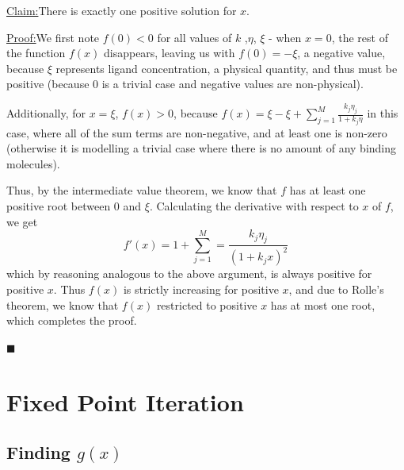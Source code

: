 \documentclass[11pt]{article} %
\newenvironment{claim}[1]{\par\noindent\underline{Claim:}\space#1}{}
\newenvironment{proof}[1]{\par\noindent\underline{Proof:}\space#1}{\hfill $\blacksquare$}
\begin{document}
\begin{claim}
There is exactly one positive solution for $x$.
\end{claim}
\begin{proof}

We first note $f(0) < 0$ for all values of $k$ ,$\eta$, $\xi$ - when $x = 0$, the rest of the function $f(x)$ disappears, leaving us with $f(0) = -\xi$, a negative value, because $\xi$ represents ligand concentration, a physical quantity, and thus must be positive (because $0$ is a trivial case and negative values are non-physical).
\par Additionally, for $x = \xi$, $f(x) > 0$, because $f(x) = \xi - \xi + \sum_{j=1}^{M} \frac{k_j \eta_j}{1+k_j\eta}$ in this case, where all of the sum terms are non-negative, and at least one is non-zero (otherwise it is modelling a trivial case where there is no amount of any binding molecules).
\par Thus, by the intermediate value theorem, we know that $f$ has at least one positive root between $0$ and $\xi$. Calculating the derivative with respect to $x$ of $f$, we get
	$$f'(x) = 1 + \sum_{j=1}^{M} = \frac{k_j \eta_j}{(1+k_jx)^2}$$
which by reasoning analogous to the above argument, is always positive for positive $x$. Thus $f(x)$ is strictly increasing for positive $x$, and due to Rolle's theorem, we know that $f(x)$ restricted to positive $x$ has at most one root, which completes the proof.

\end{proof}

\section*{Fixed Point Iteration}

\subsection*{Finding $g(x)$}
\end{document}
